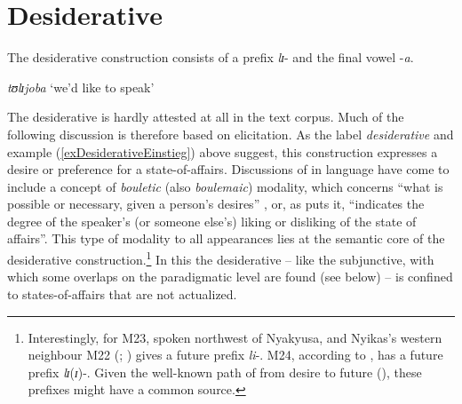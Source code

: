 \section{Desiderative}
\label{Desiderative}
The desiderative construction consists of a prefix \textit{lɪ}- and the final vowel -\textit{a}.

\begin{exe}
\ex \label{exDesiderativeEinstieg}\textit{tʊlɪjoba} `we'd like to speak'
\end{exe}
The desiderative is hardly attested at all in the text corpus. Much of the following discussion is therefore based on elicitation. As the label \textit{desiderative} and example (\ref{exDesiderativeEinstieg}) above suggest, this construction expresses a desire or preference for a state-of-affairs. Discussions of  in language have come to include a concept of \textit{bouletic} (also \textit{boulemaic}) modality, which concerns ``what is possible or necessary, given a person's desires'' \citep[2]{vonFintelK2006}, or, as \citet[12]{NuytsJ2005a} puts it, ``indicates the degree of the speaker's (or someone else's) liking or disliking of the state of affairs''. This type of modality to all appearances lies at the semantic core of the desiderative construction.\footnote{Interestingly, for  M23, spoken northwest of Nyakyusa, and Nyikas's western neighbour  M22 \citeauthor{BusseJ1940} (\citeyear[70]{BusseJ1940}; \citeyear[45]{BusseJ1960}) gives a future prefix \textit{li}-.  M24, according to \citet[85]{KutschLojengaC2007}, has a future prefix \textit{lɪ}(\textit{ɪ})-. Given the well-known path of  from desire to future (\citealt{BybeePerkinsPaglucia1994}), these prefixes might have a common source.} In this the desiderative -- like the subjunctive, with which some overlaps on the paradigmatic level are found (see below) -- is confined to states-of-affairs that are not actualized.

